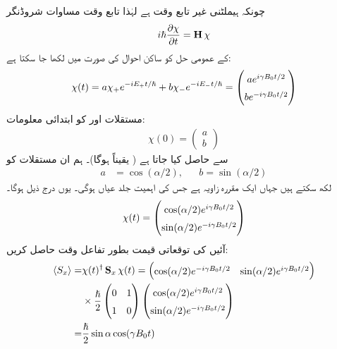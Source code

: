  چونکہ ہیملٹنی غیر تابع وقت ہے لہٰذا تابع وقت مساوات شروڈنگر 
\begin{align}\label{مساوات_تین_ابعادی_شروڈنگر_شائے_روپ}
i \hslash \frac{\partial \chi}{\partial t} = \operatorname{\mathbf{H}} \chi
\end{align}
کے عمومی حل کو ساکن احوال کی صورت میں لکھا جا سکتا ہے:
\begin{align*}
\chi (t) = a \chi_+ e^{- i E_{+} t/\hslash} + b \chi_{-} e^{- i E_{-} t / \hslash} = 
\begin{pmatrix}
\renewcommand{\arraystretch}{1.5}
a e^{i \gamma B_0 t /2} \\
b e^{- i \gamma B_0 t/2}
\end{pmatrix}
\end{align*}
مستقلات  اور  کو ابتدائی معلومات: 
\begin{align*}
\chi (0) = 
\begin{pmatrix}
a \\
b
\end{pmatrix}
\end{align*}
سے حاصل کیا جاتا ہے ( یقیناً  ہوگا)۔ ہم ان مستقلات کو
\begin{align*}
a& = \cos (\alpha/2), && b = \sin (\alpha/2)
\end{align*}
 لکھ سکتے ہیں جہاں  ایک مقررہ زاویہ ہے جس کی اہمیت جلد عیاں ہوگی۔ یوں درج ذیل ہوگا۔
\begin{align}
\renewcommand{\arraystretch}{1.5}
\chi(t) = 
\begin{pmatrix}
\cos (\alpha/2) e^{i \gamma B_0 t/2} \\
\sin (\alpha/2) e^{- i \gamma B_0 t /2}
\end{pmatrix}
\end{align}
آئیں  کی توقعاتی قیمت بطور تفاعل وقت حاصل کریں:
\begin{align}
\langle S_x \rangle =& \chi (t)^{\dagger} \mat{S}_x \chi (t) = 
\begin{pmatrix}
\cos(\alpha/2) e^{- i \gamma B_0 t/2} & \sin(\alpha/2) e^{i \gamma B_0 t/2} 
\end{pmatrix} \nonumber\\
& \times \frac{\hslash}{2}
\begin{pmatrix}
0 & 1 \\
1 & 0
\end{pmatrix}
\begin{pmatrix}
\cos(\alpha /2) e^{i \gamma B_0 t/2} \\
\sin(\alpha/2) e^{- i \gamma B_0 t/2}
\end{pmatrix} \nonumber \\
=& \frac{\hslash}{2} \sin \alpha \cos (\gamma B_0 t) 
\end{align}
